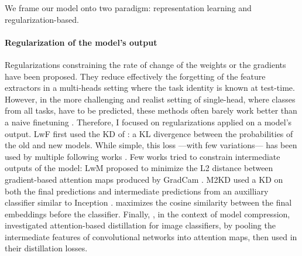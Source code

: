 We frame our model onto two paradigm: representation learning and regularization-based.

\paragraph{Regularization of the model's output} Regularizations constraining the rate of change of
the weights \citep{kirkpatrick2017ewc} or the gradients \citep{farajtabar2020ogd} have been
proposed. They reduce effectively the forgetting of the feature extractors in a multi-heads setting
where the task identity is known at test-time. However, in the more challenging and realist setting
of single-head, where classes from all tasks, have to be predicted, these methods often barely work
better than a naive finetuning \citep{lesort2019regulshortcomings}. Therefore, I focused on
regularizations applied on a model's output. LwF \citep{li2018lwf} first used the \ac{KD} of
\cite{hinton2015knowledge_distillation}: a KL divergence between the probabilities of the old and
new models. While simple, this loss ---with few variations--- has been used by multiple following
works \citep{rebuffi2017icarl,zhao2020weightalignement}. Few works tried to constrain intermediate
outputs of the model: LwM \citep{dhar2019learning_without_memorizing_gradcam} proposed to minimize
the L2 distance between gradient-based attention maps produced by GradCam
\citep{selvaraju2017gradcam}. M2KD \citep{peng2019m2kd} used a \ac{KD} on both the final predictions
and intermediate predictions from an auxilliary classifier similar to Inception
\citep{szegedy2015inception}. \cite{hou2019ucir} maximizes the cosine similarity between the final
embeddings before the classifier. Finally, \cite{zagoruyko2016distillation_attention}, in the
context of model compression, investigated attention-based distillation for image classifiers, by
pooling the intermediate features of convolutional networks into attention maps, then used in their
distillation losses.

